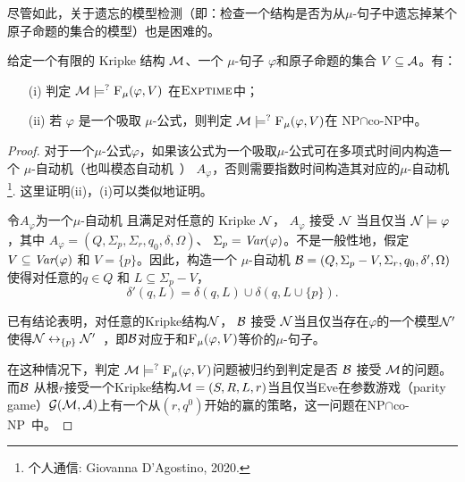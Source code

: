 尽管如此，关于遗忘的模型检测（即：检查一个结构是否为从$\mu$-句子中遗忘掉某个原子命题的集合的模型）也是困难的。
\begin{proposition}[模型检测]\label{chapter06:pro:MC}
	给定一个有限的 Kripke 结构  ${\cal M}$、一个 $\mu$-句子 $\varphi$和原子命题的集合 $V\subseteq {\cal A}$。有：
	\begin{itemize}
		\item[(i)] 判定 ${\cal M} \models^? {\textsc{F}_{\textsc{$\mu$}}}(\varphi, V)$ 在$\textsc{Exptime}$中；
		\item[(ii)] 若 $\varphi$ 是一个吸取 $\mu$-公式，则判定 ${\cal M} \models^? {\textsc{F}_{\textsc{$\mu$}}}(\varphi, V)$在 \textsc{NP}$\cap$co-\textsc{NP}中。
	\end{itemize}
\end{proposition}
\begin{proof}
	对于一个$\mu$-公式$\varphi$，如果该公式为一个吸取$\mu$-公式可在多项式时间内构造一个 $\mu$-自动机（也叫模态自动机~\cite{bradfield2018mu}） $A_{\varphi}$，否则需要指数时间构造其对应的$\mu$-自动机\footnote{个人通信: Giovanna D'Agostino, 2020.}.
	这里证明(ii)，(i)可以类似地证明。
	
	令$A_{\varphi}$为一个$\mu$-自动机 且满足对任意的 Kripke ${\cal N}$， %
	$A_{\varphi}$ 接受 ${\cal N}$ 当且仅当 ${\cal N} \models \varphi$，其中 $A_{\varphi} = (Q, \Sigma_p, \Sigma_r, q_0, \delta, \Omega)$、 $\Sigma_p = \textit{Var}(\varphi)$。不是一般性地，假定$V \subseteq \textit{Var}(\varphi)$ 和 $V=\{p\}$。因此，构造一个 $\mu$-自动机 ${\cal B}= (Q, \Sigma_p - V, \Sigma_r, q_0, \delta', \Omega)$ 使得对任意的$q\in Q$ 和 $L\subseteq \Sigma_p - V$，
	\[
	\delta'(q, L) = \delta(q, L) \cup \delta(q, L \cup \{p\}).
	\]
	
	已有结论表明，对任意的Kripke结构${\cal N}$， ${\cal B}$ 接受 ${\cal N}$当且仅当存在$\varphi$的一个模型${\cal N}'$使得${\cal N} \leftrightarrow_{\{p\}} {\cal N}'$~\cite{d1996uniform}，即${\cal B}$对应于和${\textsc{F}_{\textsc{$\mu$}}}(\varphi, V)$等价的$\mu$-句子。
	
	
	在这种情况下，判定 ${\cal M} \models^? {\textsc{F}_{\textsc{$\mu$}}}(\varphi, V)$问题被归约到判定是否 ${\cal B}$ 接受 ${\cal M}$的问题。
	而${\cal B}$ 从根$r$接受一个Kripke结构${\cal M}=(S, R,L, r)$当且仅当Eve在参数游戏（parity game）${\cal G}({\cal M}, {\cal A})$上有一个从$(r,q^0)$开始的赢的策略，这一问题在\textsc{NP}$\cap$co-\textsc{NP}~\cite{bradfield2018mu}中。
\end{proof}

